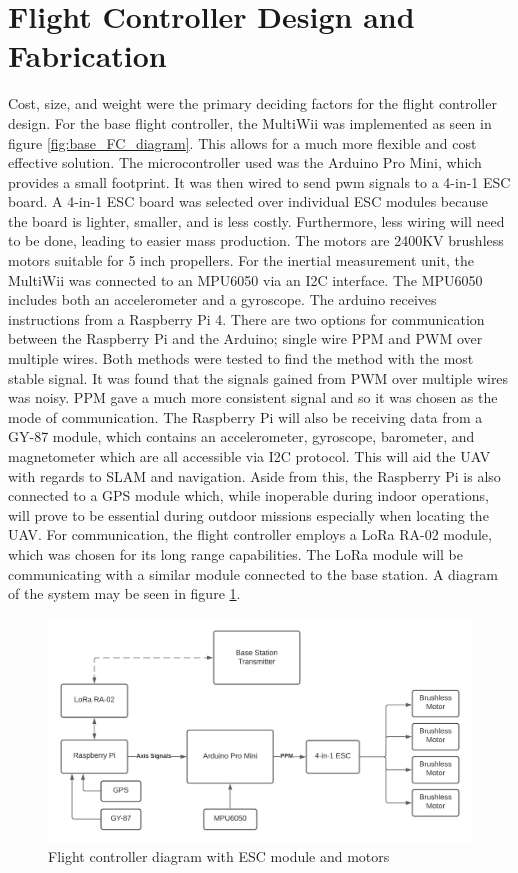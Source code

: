 \documentclass[english]{upeeei}
\begin{document}
\section{Flight Controller Design and Fabrication}
Cost, size, and weight were the primary deciding factors for the flight controller design. For the base flight
controller, the MultiWii was implemented as seen in figure \ref{fig:base_FC_diagram}. This allows for a much more flexible
and cost effective solution. The microcontroller used was the Arduino Pro Mini, which provides a small
footprint. It was then wired to send pwm signals to a 4-in-1 ESC board. A 4-in-1 ESC board was selected over
individual ESC modules because the board is lighter, smaller, and is less costly. Furthermore, less wiring will need to
be done, leading to easier mass production. The motors are 2400KV brushless motors suitable for 5 inch propellers.
For the inertial measurement unit, the MultiWii was connected to an MPU6050 via an I2C interface. The MPU6050 includes
both an accelerometer and a gyroscope. The arduino receives instructions from a Raspberry Pi 4. There are two
options for communication between the Raspberry Pi and the Arduino; single wire PPM and PWM over multiple wires. Both
methods were tested to find the method with the most stable signal. It was found that the signals gained from PWM over
multiple wires was noisy. PPM gave a much more consistent signal and so it was chosen as the mode of communication.
The Raspberry Pi will also be receiving data from a GY-87 module, which contains an accelerometer, gyroscope, barometer, 
and magnetometer which are all accessible via I2C protocol. This will aid the UAV with regards to SLAM and navigation. 
Aside from this, the Raspberry Pi is also connected to a GPS module which, while inoperable during indoor operations,
will prove to be essential during outdoor missions especially when locating the UAV. For communication, the flight controller 
employs a LoRa RA-02 module, which was chosen for its long range capabilities. The LoRa module will be communicating with a 
similar module connected to the base station. A diagram of the system may be seen in figure \ref{fig:final_FC_diagram}. 
\begin{figure}[h]
    \centering
    \includegraphics[scale=0.5]{images/final_FC diagram.png}
    \caption{Flight controller diagram with ESC module and motors}
    \label{fig:final_FC_diagram}
\end{figure}
\end{document}
